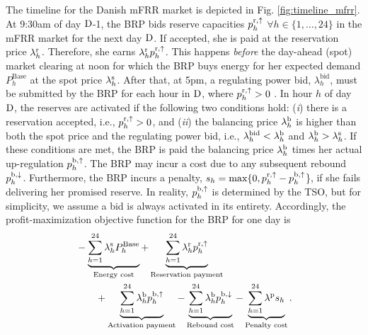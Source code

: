 The timeline for the Danish mFRR market is depicted in Fig. \ref{fig:timeline_mfrr}. At 9:30am of day $\rm{D}$-1, the BRP bids reserve capacities $p_{h}^{\rm{r},\uparrow}$ $\forall{h} \in \{1, \ldots, 24 \}$ in the mFRR market for the next day $\rm{D}$. If accepted, she is paid at the reservation price $\lambda_{h}^{\rm{r}}$. Therefore, she earns $\lambda_{h}^{\rm{r}}p_{h}^{\rm{r},\uparrow}$. This happens \textit{before} the day-ahead (spot) market clearing at noon for which the BRP buys energy for her expected demand $P_{h}^{\text{Base}}$ at the spot price $\lambda_{h}^{\rm{s}}$. After that, at 5pm, a regulating power bid, $\lambda_{h}^{\text{bid}}$, must be submitted by the BRP for each hour in $\rm{D}$, where $p_{h}^{\rm{r},\uparrow} > 0$ \cite{energinet:Systemydelser}. In hour $h$ of day $\rm{D}$, the reserves are activated if the following two conditions hold: (\textit{i}) there is a reservation accepted, i.e., $p_{h}^{\rm{r},\uparrow} > 0$, and (\textit{ii}) the balancing price $\lambda_{h}^{\rm{b}}$ is higher than both the spot price and the regulating power bid, i.e., $ \lambda_{h}^{\text{bid}} <  \lambda_{h}^{\rm{b}}$ and $ \lambda_{h}^{\rm{b}} > \lambda_{h}^{\rm{s}}$. If these conditions are met, the BRP is paid the balancing price $\lambda_{h}^{\rm{b}}$ times her actual up-regulation $p_{h}^{\rm{b},\uparrow}$. The BRP may  incur a cost due to any subsequent rebound $p_{h}^{\rm{b},\downarrow}$. Furthermore, the BRP incurs a penalty, $s_{h} = \text{max}\{0, p_{h}^{\rm{r},\uparrow} - p_{h}^{\rm{b},\uparrow}$\}, if she fails delivering her promised reserve. In reality, $p_{h}^{\rm{b},\uparrow}$ is determined by the TSO, but for simplicity, we assume a bid is always activated in its entirety.
Accordingly, the profit-maximization objective function for the BRP  for one day is
%
\begin{align}\label{eq:mFRRObjective}
     & - \underbrace{\sum_{h=1}^{24} \lambda^{\rm{s}}_{h}P^{\text{Base}}_{h}}_{\textrm{Energy cost}} + \underbrace{\sum_{h=1}^{24}\lambda_{h}^{\rm{r}} p^{\rm{r}, \uparrow}_{h}}_{\textrm{Reservation payment}}  \notag \\ & \quad \quad + \underbrace{\sum_{h=1}^{24}  \lambda_{h}^{\rm{b}} p^{\rm{b},\uparrow}_{h}}_{\textrm{Activation payment}} - \underbrace{\sum_{h=1}^{24}  \lambda_{h}^{\rm{b}} p^{\rm{b},\downarrow}_{h}}_{\textrm{Rebound cost}} - \underbrace{ \sum_{h=1}^{24}  \lambda^{\rm{p}}s_{h}}_{\textrm{Penalty cost}}.
\end{align}


